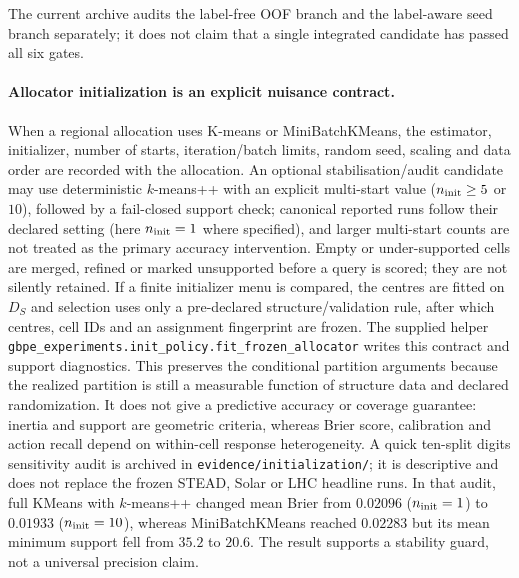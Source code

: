 \documentclass[11pt,a4paper]{article}
\numberwithin{equation}{section}
\theoremstyle{definition}\newtheorem{definition}[theorem]{Definition}
\theoremstyle{remark}\newtheorem{remark}[theorem]{Remark}
\begin{document}
The current archive audits the label-free OOF branch and the label-aware seed branch separately; it does not claim that a single integrated candidate has passed all six gates.

\paragraph{Allocator initialization is an explicit nuisance contract.}
When a regional allocation uses K-means or MiniBatchKMeans, the estimator,
initializer, number of starts, iteration/batch limits, random seed, scaling
and data order are recorded with the allocation. An optional stabilisation/audit
candidate may use deterministic $k$-means++ with an explicit multi-start value
($n_{\rm init}\geq5$ or $10$), followed by a fail-closed support check; canonical
reported runs follow their declared setting (here $n_{\rm init}=1$ where specified),
and larger multi-start counts are not treated as the primary accuracy intervention. Empty
or under-supported cells are merged, refined or marked unsupported before a
query is scored; they are not silently retained. If a finite initializer menu
is compared, the centres are fitted on $D_S$ and selection uses only a
pre-declared structure/validation rule, after which centres, cell IDs and an
assignment fingerprint are frozen. The supplied helper
\texttt{gbpe\_experiments.init\_policy.fit\_frozen\_allocator} writes this
contract and support diagnostics. This preserves the conditional partition
arguments because the realized partition is still a measurable function of
structure data and declared randomization. It does not give a predictive
accuracy or coverage guarantee: inertia and support are geometric criteria,
whereas Brier score, calibration and action recall depend on within-cell
response heterogeneity. A quick ten-split digits sensitivity audit is archived
in \texttt{evidence/initialization/}; it is descriptive and does not replace
the frozen STEAD, Solar or LHC headline runs. In that audit, full KMeans with
$k$-means++ changed mean Brier from $0.02096$ ($n_{\rm init}=1$) to $0.01933$
($n_{\rm init}=10$), whereas MiniBatchKMeans reached $0.02283$ but its mean
minimum support fell from $35.2$ to $20.6$. The result supports a stability
guard, not a universal precision claim.
\end{document}

